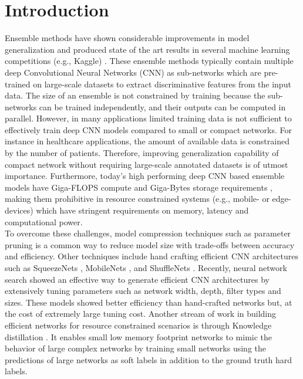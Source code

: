 \documentclass{ecai}
\begin{document}
\section{Introduction}
Ensemble methods have shown considerable improvements in model generalization and produced state of the art results in several machine learning competitions (e.g., Kaggle) \cite{chen2017deeplab}. These ensemble methods typically contain multiple deep Convolutional Neural Networks (CNN) as sub-networks which are pre-trained on large-scale datasets to extract discriminative features from the input data. 
The size of an ensemble is not constrained by training because the sub-networks can be trained independently, and their outputs can be computed in parallel. However, in many applications limited training data is not sufficient to effectively train deep CNN models compared to small or compact networks. For instance in healthcare applications, the amount of available data is constrained by the number of patients. Therefore, improving generalization capability of compact network without requiring large-scale annotated datasets is of utmost importance.
Furthermore, today's high performing deep CNN based ensemble models have Giga-FLOPS compute and Giga-Bytes storage requirements \cite{huang2018gpipe}, making them prohibitive in resource constrained systems (e.g., mobile- or edge-devices) which have stringent requirements on memory, latency and computational power.
\\
\indent
To overcome these challenges, model compression techniques such as parameter pruning \cite{yu2018nisp} is a common way to reduce model size with trade-offs between accuracy and efficiency. Other techniques include hand crafting efficient CNN architectures such as SqueezeNets \cite{iandola2016squeezenet}, MobileNets \cite{howard2017mobilenets}, and ShuffleNets \cite{zhang2018shufflenet}. Recently, neural network search showed an effective way to generate efficient CNN architectures \cite{tan2019mnasnet,cai2018proxylessnas} by extensively tuning parameters such as network width, depth, filter types and sizes. These models showed better efficiency than hand-crafted networks but, at the cost of extremely large tuning cost. 
Another stream of work in building efficient networks for resource constrained scenarios is through Knowledge distillation \cite{hinton2015distilling}. It enables small low memory footprint networks to mimic the behavior of large complex networks by training small networks using the predictions of large networks as soft labels in addition to the ground truth hard labels. 
\end{document}
